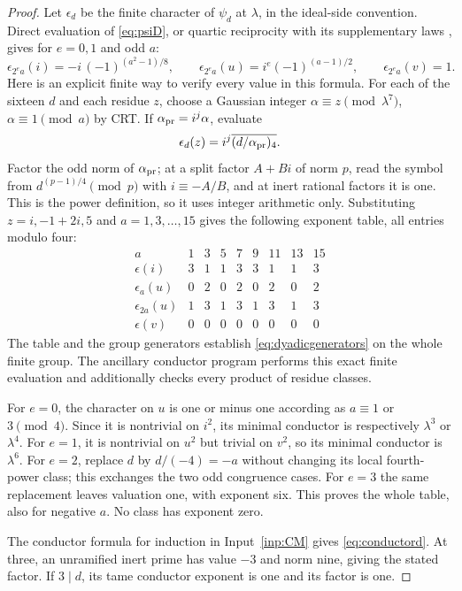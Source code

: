 \documentclass[11pt,a4paper]{article}
\numberwithin{equation}{section}
\theoremstyle{definition}
\theoremstyle{remark}
\begin{document}
\begin{proof}
Let $\epsilon_d$ be the finite character of $\psi_d$ at $\lambda$, in the ideal-side convention. Direct evaluation of \eqref{eq:psiD}, or quartic reciprocity with its supplementary laws \cite[Proposition 2.1 and (2.7)]{DDW}, gives for $e=0,1$ and odd $a$:
\begin{equation}\label{eq:dyadicgenerators}
 \epsilon_{2^ea}(i)=-i\,(-1)^{(a^2-1)/8},\qquad
 \epsilon_{2^ea}(u)=i^e(-1)^{(a-1)/2},\qquad
 \epsilon_{2^ea}(v)=1.
\end{equation}
Here is an explicit finite way to verify every value in this formula. For each of the sixteen $d$ and each residue $z$, choose a Gaussian integer
$\alpha\equiv z\pmod{\lambda^7}$, $\alpha\equiv1\pmod a$ by CRT. If $\alpha_{\rm pr}=i^j\alpha$, evaluate
\[
 \epsilon_d(z)=i^j\overline{(d/\alpha_{\rm pr})_4}.
\]
Factor the odd norm of $\alpha_{\rm pr}$; at a split factor $A+Bi$ of norm $p$, read the symbol from
$d^{(p-1)/4}\pmod p$ with $i\equiv-A/B$, and at inert rational factors it is one. This is the power definition, so it uses integer arithmetic only. Substituting $z=i,-1+2i,5$ and $a=1,3,\ldots,15$ gives the following exponent table, all entries modulo four:
\[
\begin{array}{c|rrrrrrrr}
 a&1&3&5&7&9&11&13&15\\ \hline
 \epsilon(i)&3&1&1&3&3&1&1&3\\
 \epsilon_a(u)&0&2&0&2&0&2&0&2\\
 \epsilon_{2a}(u)&1&3&1&3&1&3&1&3\\
 \epsilon(v)&0&0&0&0&0&0&0&0
\end{array}
\]
The table and the group generators establish \eqref{eq:dyadicgenerators} on the whole finite group. The ancillary conductor program performs this exact finite evaluation and additionally checks every product of residue classes.

For $e=0$, the character on $u$ is one or minus one according as $a\equiv1$ or $3\pmod4$. Since it is nontrivial on $i^2$, its minimal conductor is respectively $\lambda^3$ or $\lambda^4$. For $e=1$, it is nontrivial on $u^2$ but trivial on $v^2$, so its minimal conductor is $\lambda^6$. For $e=2$, replace $d$ by $d/(-4)=-a$ without changing its local fourth-power class; this exchanges the two odd congruence cases. For $e=3$ the same replacement leaves valuation one, with exponent six. This proves the whole table, also for negative $a$. No class has exponent zero.

The conductor formula for induction in Input~\ref{inp:CM} gives \eqref{eq:conductord}. At three, an unramified inert prime has value $-3$ and norm nine, giving the stated factor. If $3\mid d$, its tame conductor exponent is one and its factor is one.
\end{proof}
\end{document}
